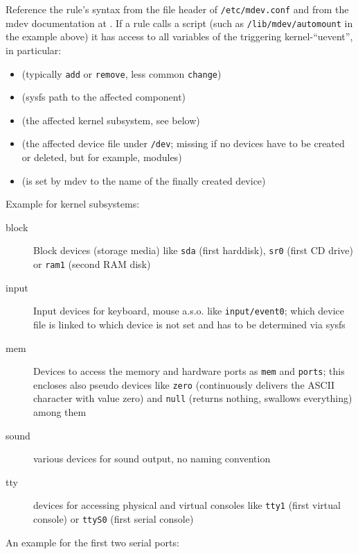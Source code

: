 Reference the rule's syntax from the file header of \texttt{/etc/mdev.conf}
and from the mdev documentation at
. If a rule
calls a script (such as \texttt{/lib/mdev/automount} in the example above)
it has access to all variables of the triggering kernel-``uevent'', in particular:

\begin{itemize}
\item {} (typically \texttt{add} or \texttt{remove}, less common
\texttt{change})
\item {} (sysfs path to the affected component)
\item {} (the affected kernel subsystem, see below)
\item {} (the affected device file under \texttt{/dev}; missing if
no devices have to be created or deleted, but for example, modules)
\item {} (is set by mdev to the name of the finally created device)
\end{itemize}

Example for kernel subsystems:

\begin{description}
\item[block] Block devices (storage media) like \texttt{sda} (first harddisk),
             \texttt{sr0} (first CD drive) or \texttt{ram1} (second
             RAM disk)
\item[input] Input devices for keyboard, mouse a.s.o. like
             \texttt{input/event0}; which device file is linked to which device
             is not set and has to be determined via sysfs
\item[mem]   Devices to access the memory and hardware ports as \texttt{mem} and 
	     \texttt{ports}; this encloses also pseudo devices like \texttt{zero}
	     (continuously delivers the ASCII character with value zero) and 
	     \texttt{null} (returns nothing, swallows everything) among them
\item[sound] various devices for sound output, no naming convention
\item[tty]   devices for accessing physical and virtual consoles like
             \texttt{tty1} (first virtual console) or \texttt{ttyS0} (first
             serial console)\end{description}

An example for the first two serial ports:

